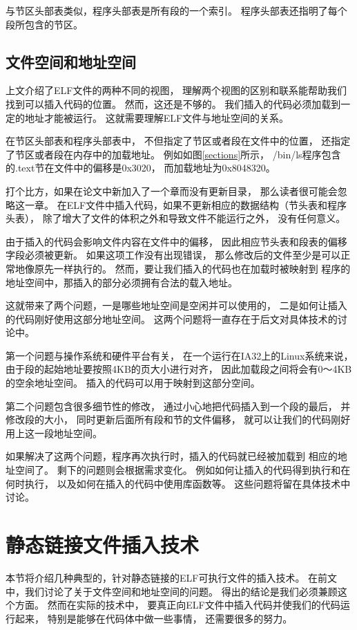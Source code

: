 与节区头部表类似，程序头部表是所有段的一个索引。
程序头部表还指明了每个段所包含的节区。


\subsection{文件空间和地址空间}

上文介绍了ELF文件的两种不同的视图，
理解两个视图的区别和联系能帮助我们找到可以插入代码的位置。
然而，这还是不够的。
我们插入的代码必须加载到一定的地址才能被运行。
这就需要理解ELF文件与地址空间的关系。

在节区头部表和程序头部表中，
不但指定了节区或者段在文件中的位置，
还指定了节区或者段在内存中的加载地址。
例如如图\ref{sections}所示，
/bin/ls程序包含的.text节在文件中的偏移是0x3020，
而加载地址为0x8048320。

打个比方，如果在论文中新加入了一个章而没有更新目录，
那么读者很可能会忽略这一章。
在ELF文件中插入代码，如果不更新相应的数据结构（节头表和程序头表），
除了增大了文件的体积之外和导致文件不能运行之外，
没有任何意义。

由于插入的代码会影响文件内容在文件中的偏移，
因此相应节头表和段表的偏移字段必须被更新。
如果这项工作没有出现错误，
那么修改后的文件至少是可以正常地像原先一样执行的。
然而，要让我们插入的代码也在加载时被映射到
程序的地址空间中，那插入的部分必须拥有合法的载入地址。

这就带来了两个问题，一是哪些地址空间是空闲并可以使用的，
二是如何让插入的代码刚好使用这部分地址空间。
这两个问题将一直存在于后文对具体技术的讨论中。

第一个问题与操作系统和硬件平台有关，
在一个运行在IA32上的Linux系统来说，
由于段的起始地址要按照4KB的页大小进行对齐，
因此加载段之间将会有0～4KB的空余地址空间。
插入的代码可以用于映射到这部分空间。

第二个问题包含很多细节性的修改，
通过小心地把代码插入到一个段的最后，
并修改段的大小，
同时更新后面所有段和节的文件偏移，
就可以让我们的代码刚好用上这一段地址空间。

如果解决了这两个问题，程序再次执行时，插入的代码就已经被加载到
相应的地址空间了。
剩下的问题则会根据需求变化。
例如如何让插入的代码得到执行和在何时执行，
以及如何在插入的代码中使用库函数等。
这些问题将留在具体技术中讨论。

\section{静态链接文件插入技术}

本节将介绍几种典型的，针对静态链接的ELF可执行文件的插入技术。
在前文中，我们讨论了关于文件空间和地址空间的问题。
得出的结论是我们必须兼顾这个方面。
然而在实际的技术中，
要真正向ELF文件中插入代码并使我们的代码运行起来，
特别是能够在代码体中做一些事情，
还需要很多的努力。

